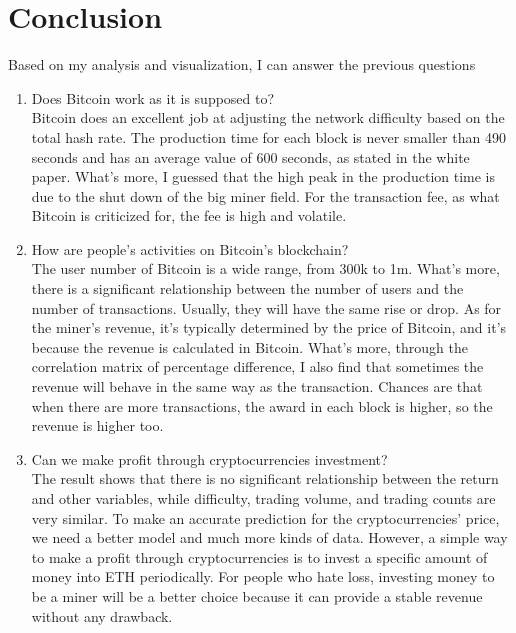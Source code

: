 \documentclass[a4paper]{article}
\begin{document}
\section{Conclusion}
Based on my analysis and visualization, I can answer the previous questions
\begin{enumerate}[1]
    \item Does Bitcoin work as it is supposed to? \\ Bitcoin does an excellent job at adjusting the network difficulty based on the total hash rate. The production time for each block is never smaller than 490 seconds and has an average value of 600 seconds, as stated in the white paper. What's more, I guessed that the high peak in the production time is due to the shut down of the big miner field. For the transaction fee, as what Bitcoin is criticized for, the fee is high and volatile.
    \item How are people's activities on Bitcoin’s blockchain? \\ The user number of Bitcoin is a wide range, from 300k to 1m. What's more, there is a significant relationship between the number of users and the number of transactions. Usually, they will have the same rise or drop. As for the miner's revenue, it's typically determined by the price of Bitcoin, and it's because the revenue is calculated in Bitcoin. What's more, through the correlation matrix of percentage difference, I also find that sometimes the revenue will behave in the same way as the transaction. Chances are that when there are more transactions, the award in each block is higher, so the revenue is higher too.
    \item Can we make profit through cryptocurrencies investment? \\ The result shows that there is no significant relationship between the return and other variables, while difficulty, trading volume, and trading counts are very similar. To make an accurate prediction for the cryptocurrencies' price, we need a better model and much more kinds of data. However, a simple way to make a profit through cryptocurrencies is to invest a specific amount of money into ETH periodically. For people who hate loss, investing money to be a miner will be a better choice because it can provide a stable revenue without any drawback.
\end{enumerate}
\end{document}
